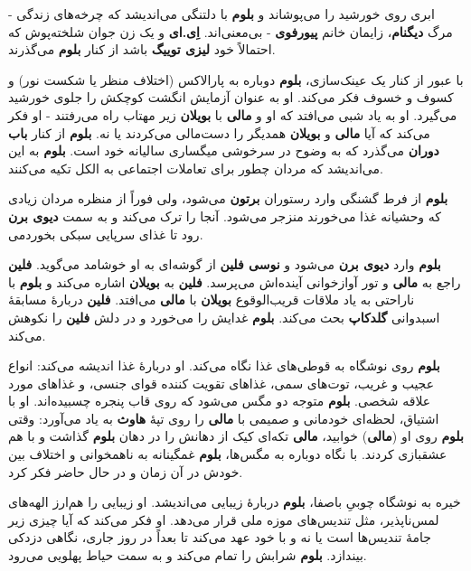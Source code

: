 \documentclass[12pt]{book}
\newcommand{\noun}[1]{{\textbf{#1}}}
\begin{document}
    ابری روی خورشید را می‌پوشاند و \noun{بلوم} با دلتنگی می‌اندیشد که چرخه‌های زندگی - مرگ \noun{دیگنام}، زایمان خانم \noun{پیورفوی} - بی‌معنی‌اند. \noun{اِی.ای} و یک زن جوان شلخته‌پوش که احتمالاً خود \noun{لیزی توییگ} باشد از کنار \noun{بلوم} می‌گذرند.

    با عبور از کنار یک عینک‌سازی، \noun{بلوم} دوباره به پارالاکس (اختلاف منظر یا شکست نور) و کسوف و خسوف فکر می‌کند. او به عنوان آزمایش انگشت کوچکش را جلوی خورشید می‌گیرد. او به یاد شبی می‌افتد که او و \noun{مالی} با \noun{بویلان} زیر مهتاب راه می‌رفتند - او فکر می‌کند که آیا \noun{مالی} و \noun{بویلان} همدیگر را دست‌مالی می‌کردند یا نه. \noun{بلوم} از کنار \noun{باب دوران} می‌گذرد که به وضوح در سرخوشی میگساری سالیانه خود است. \noun{بلوم} به این می‌اندیشد که مردان چطور برای تعاملات اجتماعی به الکل تکیه می‌کنند.

    \noun{بلوم} از فرط گشنگی وارد رستوران \noun{برتون} می‌شود، ولی فوراً از منظره مردان زیادی که وحشیانه غذا می‌خورند منزجر می‌شود. آنجا را ترک می‌کند و به سمت \noun{دیوی برن} می‎‌رود تا غذای سرپایی سبکی بخورد.

    \noun{بلوم} وارد \noun{دیوی برن} می‌شود و \noun{نوسی فلین} از گوشه‌ای به او خوشامد می‌گوید. \noun{فلین} راجع به \noun{مالی} و تور آوازخوانی آینده‌اش می‌پرسد. \noun{فلین} به \noun{بویلان} اشاره می‌کند و \noun{بلوم} با ناراحتی به یاد ملاقات قریب‌الوقوع \noun{بویلان} با \noun{مالی} می‌افتد. \noun{فلین} دربارهٔ مسابقهٔ اسبدوانی \noun{گلدکاپ} بحث می‌کند. \noun{بلوم} غدایش را می‌خورد و در دلش \noun{فلین} را نکوهش می‌کند.

    \noun{بلوم} روی نوشگاه به قوطی‌های غذا نگاه می‌کند. او دربارهٔ غذا اندیشه می‌کند: انواع عجیب و غریب، توت‌های سمی، غذاهای تقویت کننده قوای جنسی، و غذاهای مورد علاقه شخصی. \noun{بلوم} متوجه دو مگس می‌شود که روی قاب پنجره چسبیده‌اند. او با اشتیاق، لحظه‌ای خودمانی و صمیمی با \noun{مالی} را روی تپهٔ \noun{هاوث} به یاد می‌آورد: وقتی \noun{بلوم} روی او (\noun{مالی}) خوابید، \noun{مالی} تکه‌ای کیک از دهانش را در دهان \noun{بلوم} گذاشت و با هم عشقبازی کردند. با نگاه دوباره به مگس‌ها، \noun{بلوم} غمگینانه به ناهمخوانی و اختلاف بین خودش در آن زمان و در حال حاضر فکر کرد.

    خیره به نوشگاه چوبیِ باصفا، \noun{بلوم} دربارهٔ زیبایی می‌اندیشد. او زیبایی را هم‌ارز الهه‌های لمس‌ناپذیر، مثل تندیس‌های موزه ملی قرار می‌دهد. او فکر می‌کند که آیا چیزی زیر جامهٔ تندیس‌ها است یا نه و با خود عهد می‌کند تا بعداً در روز جاری، نگاهی دزدکی بیندازد. \noun{بلوم} شرابش را تمام می‌کند و به سمت حیاط پهلویی می‌رود.
\end{document}
